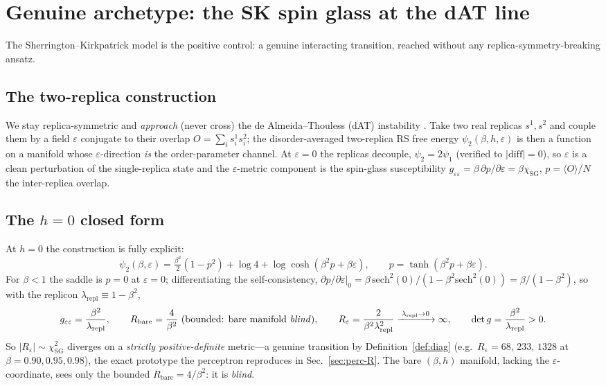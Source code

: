 \documentclass[a4paper,11pt]{article}
\theoremstyle{plain}
\theoremstyle{definition}
\theoremstyle{remark}
\newcommand{\Ric}{R}
\newcommand{\eps}{\varepsilon}
\newcommand{\detg}{\det g}
\newcommand{\repl}{\lambda_{\mathrm{repl}}}
\begin{document}
\section{Genuine archetype: the SK spin glass at the dAT line}\label{sec:sk}
The Sherrington--Kirkpatrick model \cite{sk1975} is the positive control: a genuine interacting transition,
reached without any replica-symmetry-breaking ansatz.

\subsection{The two-replica construction}\label{sec:sk-construct}
We stay replica-symmetric and \emph{approach} (never cross) the de Almeida--Thouless (dAT) instability
\cite{at1978}. Take two real replicas $s^1,s^2$ and couple them by a field $\eps$ conjugate to their overlap
$O=\sum_i s^1_i s^2_i$; the disorder-averaged two-replica RS free energy $\psi_2(\beta,h,\eps)$ is then a
function on a manifold whose $\eps$-direction \emph{is} the order-parameter channel. At $\eps=0$ the replicas
decouple, $\psi_2=2\psi_1$ (verified to $|\text{diff}|=0$), so $\eps$ is a clean perturbation of the
single-replica state and the $\eps$-metric component is the spin-glass susceptibility
$g_{\eps\eps}=\beta\,\partial p/\partial\eps=\beta\chi_{\mathrm{SG}}$, $p=\langle O\rangle/N$ the
inter-replica overlap.

\subsection{The $h=0$ closed form}\label{sec:sk-h0}
At $h=0$ the construction is fully explicit:
\begin{equation}
\psi_2(\beta,\eps)=\tfrac{\beta^2}{2}(1-p^2)+\log4+\log\cosh(\beta^2 p+\beta\eps),\qquad p=\tanh(\beta^2 p+\beta\eps).
\label{eq:psi2}
\end{equation}
For $\beta<1$ the saddle is $p=0$ at $\eps=0$; differentiating the self-consistency,
$\partial p/\partial\eps|_0=\beta\,\mathrm{sech}^2(0)/(1-\beta^2\mathrm{sech}^2(0))=\beta/(1-\beta^2)$, so
with the replicon $\repl\equiv1-\beta^2$,
\begin{equation}
g_{\eps\eps}=\frac{\beta^2}{\repl},\qquad
\Ric_{\text{bare}}=\frac{4}{\beta^2}\ (\text{bounded: bare manifold \emph{blind}}),\qquad
\Ric_{\eps}=\frac{2}{\beta^2\repl^2}\xrightarrow{\;\repl\to0\;}\infty,\qquad \detg=\frac{\beta^2}{\repl}>0.
\label{eq:sk}
\end{equation}
So $|\Ric_\eps|\sim\chi_{\mathrm{SG}}^2$ diverges on a \emph{strictly positive-definite} metric---a genuine
transition by Definition~\ref{def:diag} (e.g.\ $\Ric_\eps=68,\,233,\,1328$ at $\beta=0.90,0.95,0.98$), the
exact prototype the perceptron reproduces in Sec.~\ref{sec:perc-R}. The bare $(\beta,h)$ manifold, lacking
the $\eps$-coordinate, sees only the bounded $\Ric_{\text{bare}}=4/\beta^2$: it is \emph{blind}.
\end{document}
